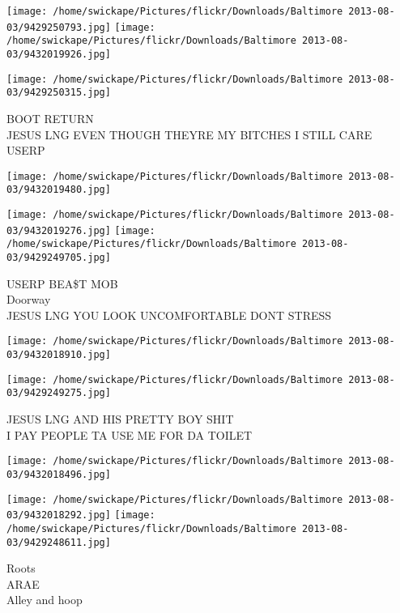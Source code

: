 \documentclass[10pt,letterpaper]{article}
\begin{document}
\texttt{[image: /home/swickape/Pictures/flickr/Downloads/Baltimore 2013-08-03/9429250793.jpg]}
\texttt{[image: /home/swickape/Pictures/flickr/Downloads/Baltimore 2013-08-03/9432019926.jpg]}

\vspace{0.25in}
\texttt{[image: /home/swickape/Pictures/flickr/Downloads/Baltimore 2013-08-03/9429250315.jpg]}

BOOT RETURN\\
JESUS LNG EVEN THOUGH THEYRE MY BITCHES I STILL CARE\\
USERP\\
\pagebreak

\texttt{[image: /home/swickape/Pictures/flickr/Downloads/Baltimore 2013-08-03/9432019480.jpg]}

\vspace{0.25in}
\texttt{[image: /home/swickape/Pictures/flickr/Downloads/Baltimore 2013-08-03/9432019276.jpg]}
\texttt{[image: /home/swickape/Pictures/flickr/Downloads/Baltimore 2013-08-03/9429249705.jpg]}

USERP BEA\$T MOB\\
Doorway\\
JESUS LNG YOU LOOK UNCOMFORTABLE DONT STRESS\\
\pagebreak

\texttt{[image: /home/swickape/Pictures/flickr/Downloads/Baltimore 2013-08-03/9432018910.jpg]}

\vspace{0.25in}
\texttt{[image: /home/swickape/Pictures/flickr/Downloads/Baltimore 2013-08-03/9429249275.jpg]}

JESUS LNG AND HIS PRETTY BOY SHIT\\
I PAY PEOPLE TA USE ME FOR DA TOILET\\
\pagebreak

\texttt{[image: /home/swickape/Pictures/flickr/Downloads/Baltimore 2013-08-03/9432018496.jpg]}

\vspace{0.25in}
\texttt{[image: /home/swickape/Pictures/flickr/Downloads/Baltimore 2013-08-03/9432018292.jpg]}
\texttt{[image: /home/swickape/Pictures/flickr/Downloads/Baltimore 2013-08-03/9429248611.jpg]}

Roots\\
ARAE\\
Alley and hoop\\
\pagebreak
\end{document}
